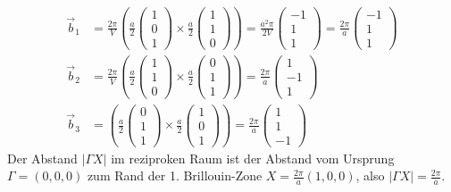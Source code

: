 \begin{align*}
\vec{b}_1 &= \frac{2\pi}{V}\left(\frac{a}{2}\begin{pmatrix}1\\0\\1\end{pmatrix}\times\frac{a}{2}\begin{pmatrix}1\\1\\0\end{pmatrix}\right) = \frac{a^2\pi}{2V}\begin{pmatrix}-1\\1\\1\end{pmatrix} = \frac{2 \pi}{a}\begin{pmatrix}-1\\1\\1\end{pmatrix} \\
\vec{b}_2 &= \frac{2\pi}{V}\left(\frac{a}{2}\begin{pmatrix}1\\1\\0\end{pmatrix}\times\frac{a}{2}\begin{pmatrix}0\\1\\1\end{pmatrix}\right) = \frac{2\pi}{a}\begin{pmatrix}1\\-1\\1\end{pmatrix}\\
\vec{b}_3 &= \left(\frac{a}{2}\begin{pmatrix}0\\1\\1\end{pmatrix}\times\frac{a}{2}\begin{pmatrix}1\\0\\1\end{pmatrix}\right) = \frac{2\pi}{a}\begin{pmatrix}1\\1\\-1\end{pmatrix}
\end{align*}
Der Abstand $| \Gamma X |$ im reziproken Raum ist der Abstand vom Ursprung $\Gamma = (0,0,0)$ zum
Rand der 1. Brillouin-Zone $X = \frac{2 \pi}{a}(1,0,0)$, also $| \Gamma X | = \frac{2 \pi}{a}$.

